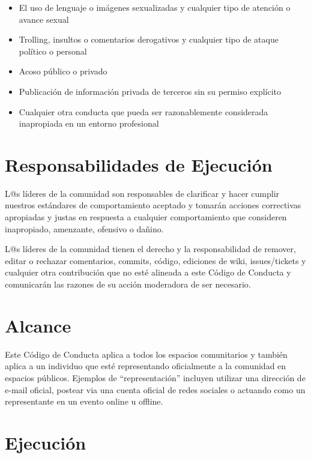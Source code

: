 \documentclass[
]{book}
\providecommand{\tightlist}{%
  \setlength{\itemsep}{0pt}\setlength{\parskip}{0pt}}
\begin{document}
\begin{itemize}
\tightlist
\item
  El uso de lenguaje o imágenes sexualizadas y cualquier tipo de atención o avance sexual
\item
  Trolling, insultos o comentarios derogativos y cualquier tipo de ataque político o personal
\item
  Acoso público o privado
\item
  Publicación de información privada de terceros sin su permiso explícito
\item
  Cualquier otra conducta que pueda ser razonablemente considerada inapropiada en un entorno profesional
\end{itemize}

\hypertarget{responsabilidades-de-ejecuciuxf3n}{%
\section{Responsabilidades de Ejecución}\label{responsabilidades-de-ejecuciuxf3n}}

L@s líderes de la comunidad son responsables de clarificar y hacer cumplir nuestros estándares de comportamiento aceptado y tomarán acciones correctivas apropiadas y justas en respuesta a cualquier comportamiento que consideren inapropiado, amenzante, ofensivo o dañino.

L@s líderes de la comunidad tienen el derecho y la responsabilidad de remover, editar o rechazar comentarios, commits, código, ediciones de wiki, issues/tickets y cualquier otra contribución que no esté alineada a este Código de Conducta y comunicarán las razones de su acción moderadora de ser necesario.

\hypertarget{alcance}{%
\section{Alcance}\label{alcance}}

Este Código de Conducta aplica a todos los espacios comunitarios y también aplica a un individuo que esté representando oficialmente a la comunidad en espacios públicos. Ejemplos de ``representación'' incluyen utilizar una dirección de e-mail oficial, postear via una cuenta oficial de redes sociales o actuando como un representante en un evento online u offline.

\hypertarget{ejecuciuxf3n}{%
\section{Ejecución}\label{ejecuciuxf3n}}
\end{document}
